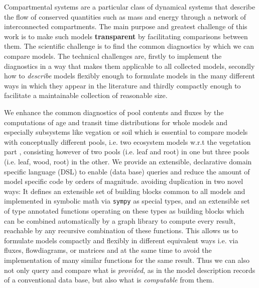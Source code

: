 
Compartmental systems are a particular class of dynamical systems that describe
the flow of conserved quantities such as mass and energy through a network of
interconnected compartments.  The main purpose and greatest challenge of this
work is to make such models {\bf transparent} by  facilitating  comparisons
between them.  The scientific challenge is to find the common
diagnostics by which we can compare models. The technical challenges are,
firstly to implement the diagnostics in a way that makes them applicable to all collected
models, secondly how to \emph{describe} models flexibly enough 
to formulate models in the many different
ways in which they appear in the literature and thirdly 
 compactly enough to facilitate a maintainable collection of reasonable size.

We enhance the common diagnostics of pool contents and fluxes by the 
computations of age and transit time distributions for whole models and
especially subsystems like vegation or soil which is essential 
to compare models with conceptually different pools, i.e. two ecosystem models
w.r.t the vegetation part , consisting however of two pools
(i.e. leaf and root) in one but three pools (i.e. leaf, wood, root) in the
other.  
We provide an extensible, declarative domain specific language (DSL) to enable (data base) queries and reduce the amount of model specific code by orders of magnitude. 
avoiding duplication in two novel ways: It defines an extensible set of 
building blocks common to all models and implemented in symbolic math via \texttt{sympy} as special types, and an extensible set of type annotated functions operating on these types as 
building blocks which can be combined automatically by a graph library to compute every result,
reachable by any recursive combination of these functions. 
This allows us to formulate models compactly and
flexibly in different equivalent ways i.e. via fluxes, flowdiagrams, or
matrices and at the same time to avoid the implementation of many similar
functions for the same result.  Thus we can also not only query and compare
what is \emph{provided}, as in the model description records of a conventional data
base, but also what is \emph{computable} from them.  

